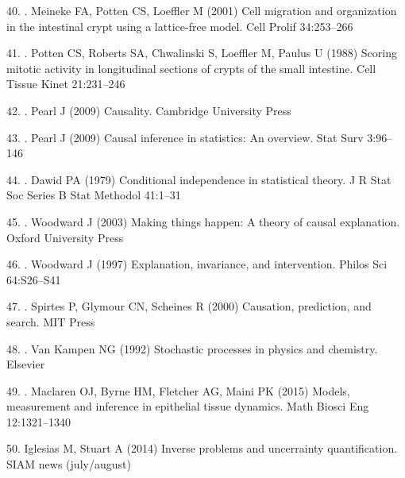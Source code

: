 \documentclass[10pt,letterpaper]{article}
\providecommand{\DIFaddtex}[1]{{\protect\color{blue} \sf #1}} %
\providecommand{\DIFdeltex}[1]{{\protect\color{red} \scriptsize #1}} %
\providecommand{\DIFaddbegin}{} %
\providecommand{\DIFaddend}{} %
\providecommand{\DIFdelbegin}{} %
\providecommand{\DIFdelend}{} %
\providecommand{\DIFadd}[1]{\texorpdfstring{\DIFaddtex{#1}}{#1}} %
\providecommand{\DIFdel}[1]{\texorpdfstring{\DIFdeltex{#1}}{}} %
\begin{document}
\hypertarget{ref-Meineke2001-na}{}
\DIFdelbegin \DIFdel{40. }\DIFdelend \DIFaddbegin \DIFadd{35. }\DIFaddend Meineke FA, Potten CS, Loeffler M (2001) Cell migration and
organization in the intestinal crypt using a lattice-free model. Cell
Prolif 34:253--266

\hypertarget{ref-Potten1988-tq}{}
\DIFdelbegin \DIFdel{41. }\DIFdelend \DIFaddbegin \DIFadd{36. }\DIFaddend Potten CS, Roberts SA, Chwalinski S, Loeffler M, Paulus U (1988)
Scoring mitotic activity in longitudinal sections of crypts of the small
intestine. Cell Tissue Kinet 21:231--246

\hypertarget{ref-Pearl2009-qh}{}
\DIFdelbegin \DIFdel{42. }\DIFdelend \DIFaddbegin \DIFadd{37. }\DIFaddend Pearl J (2009) Causality. Cambridge University Press

\hypertarget{ref-Pearl2009-jp}{}
\DIFdelbegin \DIFdel{43. }\DIFdelend \DIFaddbegin \DIFadd{38. }\DIFaddend Pearl J (2009) Causal inference in statistics: An overview. Stat
Surv 3:96--146

\hypertarget{ref-Dawid1979-gu}{}
\DIFdelbegin \DIFdel{44. }\DIFdelend \DIFaddbegin \DIFadd{39. }\DIFaddend Dawid PA (1979) Conditional independence in statistical theory. J R
Stat Soc Series B Stat Methodol 41:1--31

\hypertarget{ref-Woodward2003-oz}{}
\DIFdelbegin \DIFdel{45. }\DIFdelend \DIFaddbegin \DIFadd{40. }\DIFaddend Woodward J (2003) Making things happen: A theory of causal
explanation. Oxford University Press

\hypertarget{ref-Woodward1997-dk}{}
\DIFdelbegin \DIFdel{46. }\DIFdelend \DIFaddbegin \DIFadd{41. }\DIFaddend Woodward J (1997) Explanation, invariance, and intervention. Philos
Sci 64:S26--S41

\hypertarget{ref-Spirtes2000-zd}{}
\DIFdelbegin \DIFdel{47. }\DIFdelend \DIFaddbegin \DIFadd{42. }\DIFaddend Spirtes P, Glymour CN, Scheines R (2000) Causation, prediction, and
search. MIT Press

\hypertarget{ref-Van_Kampen1992-ik}{}
\DIFdelbegin \DIFdel{48. }\DIFdelend \DIFaddbegin \DIFadd{43. }\DIFaddend Van Kampen NG (1992) Stochastic processes in physics and chemistry.
Elsevier

\hypertarget{ref-Maclaren2015-be}{}
\DIFdelbegin \DIFdel{49. }\DIFdelend \DIFaddbegin \DIFadd{44. }\DIFaddend Maclaren OJ, Byrne HM, Fletcher AG, Maini PK (2015) Models,
measurement and inference in epithelial tissue dynamics. Math Biosci Eng
12:1321--1340

\DIFdelbegin %
\DIFdel{50. Iglesias M, Stuart A (2014) Inverse problems and uncerrainty
quantification. SIAM news (july/august)
}%
\end{document}
